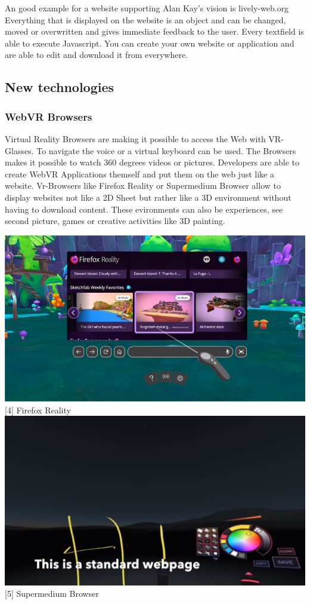 \documentclass[runningheads]{llncs}
\begin{document}
		An good example for a website supporting Alan Kay's vision is lively-web.org
		Everything that is displayed on the website is an object and can be changed, moved or overwritten and gives immediate feedback to the user. Every textfield is able to execute Javascript. You can create your own website or application and are able to edit and download it from everywhere.
		\subsection{New technologies}
			\subsubsection{WebVR Browsers}
			Virtual Reality Browsers are making it possible to access the Web with VR-Glasses. To navigate the voice or a virtual keyboard can be used. The Browsers makes it possible to watch 360 degrees videos or pictures. Developers are able to create WebVR Applications themself and put them on the web just like a website. Vr-Browsers like Firefox Reality or Supermedium Browser allow to display websites not like a 2D Sheet but rather like a 3D environment without having to download content. These evironments can also be experiences, see second picture, games or creative activities like 3D painting.
			\begin{center}
				\includegraphics[scale=0.35]{Firefox_Reality.png}
				[4]	Firefox Reality
				\includegraphics[scale=0.35]{Supermedium.png}
				[5] Supermedium Browser
			\end{center}
\end{document}
